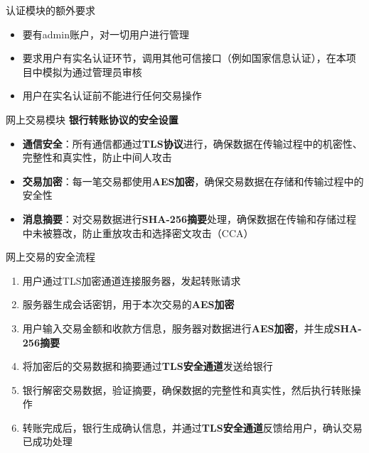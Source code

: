 \documentclass[]{beamer}
\begin{document}
    \begin{frame}{认证模块的额外要求}
        \begin{itemize}
            \item 要有admin账户，对一切用户进行管理
            \item 要求用户有实名认证环节，调用其他可信接口（例如国家信息认证），在本项目中模拟为通过管理员审核
            \item 用户在实名认证前不能进行任何交易操作
        \end{itemize}
    \end{frame}
    
    \begin{frame}{网上交易模块}
                \textbf{银行转账协议的安全设置}
                \begin{itemize}
                    \item \textbf{通信安全}：所有通信都通过\textbf{TLS协议}进行，确保数据在传输过程中的机密性、完整性和真实性，防止中间人攻击
                    \item \textbf{交易加密}：每一笔交易都使用\textbf{AES加密}，确保交易数据在存储和传输过程中的安全性
                    \item \textbf{消息摘要}：对交易数据进行\textbf{SHA-256摘要}处理，确保数据在传输和存储过程中未被篡改，防止重放攻击和选择密文攻击（CCA）
                \end{itemize}
    \end{frame}

    \begin{frame}{网上交易的安全流程}
        \begin{enumerate}
            \item 用户通过TLS加密通道连接服务器，发起转账请求
            \item 服务器生成会话密钥，用于本次交易的\textbf{AES加密}
            \item 用户输入交易金额和收款方信息，服务器对数据进行\textbf{AES加密}，并生成\textbf{SHA-256摘要}
            \item 将加密后的交易数据和摘要通过\textbf{TLS安全通道}发送给银行
            \item 银行解密交易数据，验证摘要，确保数据的完整性和真实性，然后执行转账操作
            \item 转账完成后，银行生成确认信息，并通过\textbf{TLS安全通道}反馈给用户，确认交易已成功处理
        \end{enumerate}
    \end{frame}
    
\end{document}
